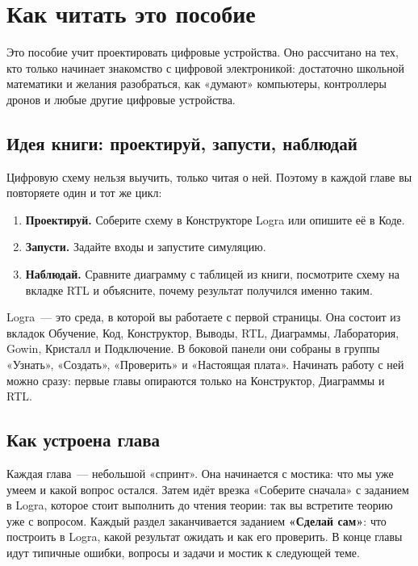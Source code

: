 \chapter*{Как читать это пособие}

Это пособие учит проектировать цифровые устройства. Оно рассчитано на тех,
кто только начинает знакомство с цифровой электроникой: достаточно школьной
математики и желания разобраться, как «думают» компьютеры, контроллеры
дронов и любые другие цифровые устройства.

\section*{Идея книги: проектируй, запусти, наблюдай}

Цифровую схему нельзя выучить, только читая о ней. Поэтому в каждой главе
вы повторяете один и тот же цикл:

\begin{enumerate}
  \item \textbf{Проектируй.} Соберите схему в Конструкторе Logra или
    опишите её в Коде.
  \item \textbf{Запусти.} Задайте входы и запустите симуляцию.
  \item \textbf{Наблюдай.} Сравните диаграмму с таблицей из книги, посмотрите схему
    на вкладке RTL и объясните, почему результат получился именно таким.
\end{enumerate}

Logra~--- это среда, в которой вы работаете с первой страницы. Она состоит
из вкладок Обучение, Код, Конструктор, Выводы, RTL, Диаграммы, Лаборатория,
Gowin, Кристалл и Подключение. В боковой панели они собраны в группы
«Узнать», «Создать», «Проверить» и «Настоящая плата». Начинать работу с ней
можно сразу: первые главы опираются только на Конструктор, Диаграммы и RTL.

\section*{Как устроена глава}

Каждая глава~--- небольшой «спринт». Она начинается с мостика: что мы уже умеем и
какой вопрос остался. Затем идёт врезка «Соберите сначала» с заданием в
Logra, которое стоит выполнить до чтения теории: так вы встретите
теорию уже с вопросом. Каждый раздел заканчивается заданием
\textbf{«Сделай сам»}: что построить в Logra, какой результат ожидать и как
его проверить. В конце главы идут типичные ошибки, вопросы и задачи и мостик к
следующей теме.

